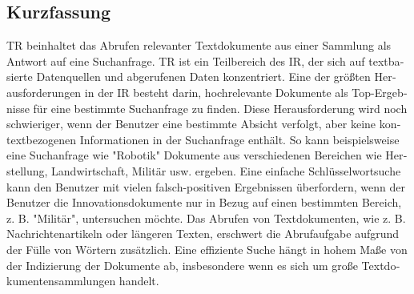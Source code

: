 
\begin{otherlanguage}{ngerman}
    \section*{Kurzfassung}
 \ac{TR} beinhaltet das Abrufen relevanter Textdokumente aus einer Sammlung als Antwort auf eine Suchanfrage. \ac{TR} ist ein Teilbereich des \ac{IR}, der sich auf textbasierte Datenquellen und abgerufenen Daten konzentriert. Eine der größten Herausforderungen in der IR besteht darin, hochrelevante Dokumente als Top-Ergebnisse für eine bestimmte Suchanfrage zu finden. Diese Herausforderung wird noch schwieriger, wenn der Benutzer eine bestimmte Absicht verfolgt, aber keine kontextbezogenen Informationen in der Suchanfrage enthält. So kann beispielsweise eine Suchanfrage wie "Robotik" Dokumente aus verschiedenen Bereichen wie Herstellung, Landwirtschaft, Militär usw. ergeben. Eine einfache Schlüsselwortsuche kann den Benutzer mit vielen falsch-positiven Ergebnissen überfordern, wenn der Benutzer die Innovationsdokumente nur in Bezug auf einen bestimmten Bereich, z. B. "Militär", untersuchen möchte. Das Abrufen von Textdokumenten, wie z. B. Nachrichtenartikeln oder längeren Texten, erschwert die Abrufaufgabe aufgrund der Fülle von Wörtern zusätzlich. Eine effiziente Suche hängt in hohem Maße von der Indizierung der Dokumente ab, insbesondere wenn es sich um große Textdokumentensammlungen handelt.


\end{otherlanguage}
